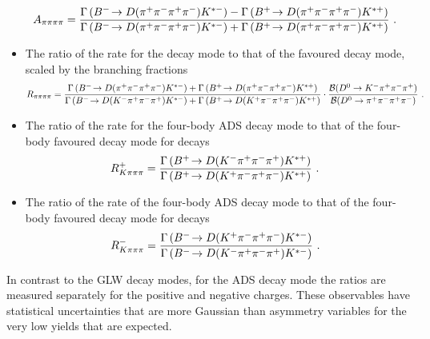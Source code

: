 \begin{itemize}
{{\begin{equation}
A_{\pi\pi\pi\pi} = \frac{\Gamma\left({{{B}^-}}\!\rightarrow {\ensuremath{D}}({{\pi}^+}{{\pi}^-}{{\pi}^+}{{\pi}^-}){{K}^{*-}}\right) - \Gamma\left({{{B}^+}}\!\rightarrow {\ensuremath{D}}({{\pi}^+}{{\pi}^-}{{\pi}^+}{{\pi}^-}){{K}^{*+}}\right)}{\Gamma\left({{{B}^-}}\!\rightarrow {\ensuremath{D}}({{\pi}^+}{{\pi}^-}{{\pi}^+}{{\pi}^-}){{K}^{*-}}\right) + \Gamma\left({{{B}^+}}\!\rightarrow {\ensuremath{D}}({{\pi}^+}{{\pi}^-}{{\pi}^+}{{\pi}^-}){{K}^{*+}}\right)} \text{ . }
\label{eqn:Apipipipi}
\end{equation}
}}
\item{The ratio of the rate for the \decay{\D}{\pip\pim\pip\pim} decay mode to that of the favoured decay mode, scaled by the branching fractions
{\footnotesize
\begin{equation}
R_{\pi\pi\pi\pi} = \frac{\Gamma\left({{{B}^-}}\!\rightarrow {\ensuremath{D}}({{\pi}^+}{{\pi}^-}{{\pi}^+}{{\pi}^-}){{K}^{*-}}\right) + \Gamma\left({{{B}^+}}\!\rightarrow {\ensuremath{D}}({{\pi}^+}{{\pi}^-}{{\pi}^+}{{\pi}^-}){{K}^{*+}}\right)}{\Gamma\left({{{B}^-}}\!\rightarrow {\ensuremath{D}}({{K}^-}{{\pi}^+}{{\pi}^-}{{\pi}^+}){{K}^{*-}}\right) + \Gamma\left({{{B}^+}}\!\rightarrow {\ensuremath{D}}({{K}^+}{{\pi}^-}{{\pi}^+}{{\pi}^-}){{K}^{*+}}\right)} \cdot \frac{\mathcal{B}(D^0 \rightarrow {\ensuremath{{K}^-}}{\ensuremath{{\pi}^+}}{\ensuremath{{\pi}^-}}{\ensuremath{{\pi}^+}})}{\mathcal{B}(D^0 \rightarrow {\ensuremath{{\pi}^+}}{\ensuremath{{\pi}^-}}{\ensuremath{{\pi}^+}}{\ensuremath{{\pi}^-}})} \text{ . }
\label{eqn:Rpipipipi}
\end{equation}}
}
\item{The ratio of the rate for the four-body ADS decay mode to that of the four-body favoured decay mode for \Bp decays
{\footnotesize
\begin{equation}
R^+_{K\pi\pi\pi} = \frac{\Gamma\left({{{B}^+}}\!\rightarrow {\ensuremath{D}}({{K}^-}{{\pi}^+}{{\pi}^-}{{\pi}^+}){{K}^{*+}}\right)}{\Gamma\left({{{B}^+}}\!\rightarrow {\ensuremath{D}}({{K}^+}{{\pi}^-}{{\pi}^+}{{\pi}^-}){{K}^{*+}}\right)} \text{ . }
\label{eqn:Rplus4body}
\end{equation}
}}
\item{The ratio of the rate of the four-body ADS decay mode to that of the four-body favoured decay mode for \Bm decays
{\footnotesize
\begin{equation}
R^-_{K\pi\pi\pi} = \frac{\Gamma\left({{{B}^-}}\!\rightarrow {\ensuremath{D}}({{K}^+}{{\pi}^-}{{\pi}^+}{{\pi}^-}){{K}^{*-}}\right)}{\Gamma\left({{{B}^-}}\!\rightarrow {\ensuremath{D}}({{K}^-}{{\pi}^+}{{\pi}^-}{{\pi}^+}){{K}^{*-}}\right)} \text{ . }
\label{eqn:Rminus4body}
\end{equation}
}}
\end{itemize}

\noindent
In contrast to the GLW decay modes, for the ADS decay mode the ratios are measured separately for the positive and negative charges. These observables have statistical uncertainties that are more Gaussian than asymmetry variables for the very low yields that are expected. 

